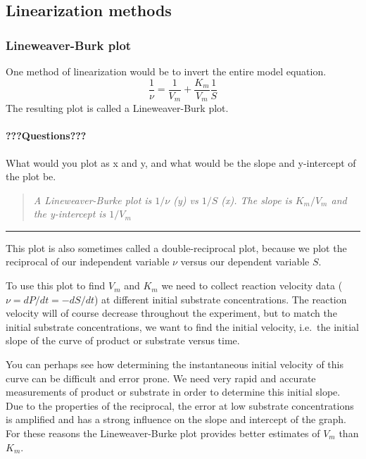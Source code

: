 \documentclass[
]{article}
\begin{document}
\hypertarget{linearization-methods}{%
\subsection{Linearization methods}\label{linearization-methods}}

\hypertarget{lineweaver-burk-plot}{%
\subsubsection{Lineweaver-Burk plot}\label{lineweaver-burk-plot}}

One method of linearization would be to invert the entire model equation.
\[\frac{1}{\nu} = \frac{1}{V_m} + \frac{K_m}{V_m} \frac{1}{S}\]
The resulting plot is called a Lineweaver-Burk plot.

\hypertarget{questions-8}{%
\paragraph{???Questions???}\label{questions-8}}

What would you plot as x and y, and what would be the slope and y-intercept of the plot be.

\begin{quote}
\emph{A Lineweaver-Burke plot is \(1/\nu\) (y) vs \(1/S\) (x). The slope is \(K_m/V_m\) and the y-intercept is \(1/V_m\)}
\end{quote}

\begin{center}\rule{0.5\linewidth}{0.5pt}\end{center}

This plot is also sometimes called a double-reciprocal plot, because we plot the reciprocal of our independent variable \(\nu\) versus our dependent variable \(S\).

To use this plot to find \(V_m\) and \(K_m\) we need to collect reaction velocity data (\(\nu = dP/dt = -dS/dt\)) at different initial substrate concentrations. The reaction velocity will of course decrease throughout the experiment, but to match the initial substrate concentrations, we want to find the initial velocity, i.e.~the initial slope of the curve of product or substrate versus time.

You can perhaps see how determining the instantaneous initial velocity of this curve can be difficult and error prone. We need very rapid and accurate measurements of product or substrate in order to determine this initial slope. Due to the properties of the reciprocal, the error at low substrate concentrations is amplified and has a strong influence on the slope and intercept of the graph. For these reasons the Lineweaver-Burke plot provides better estimates of \(V_m\) than \(K_m\).
\end{document}
